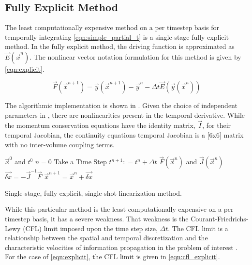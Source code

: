 \subsection{Fully Explicit Method}
\label{subsect:numerics_explicit}
The least computationally expensive method on a per timestep basis for temporally integrating \eqref{eqn:simple_partial_t} is a single-stage fully explicit method.
In the fully explicit method, the driving function is approximated as $\vec{E}(\vec{x}^n)$.
The nonlinear vector notation formulation for this method is given by \eqref{eqn:explicit}.

\begin{equation}
\label{eqn:explicit}
\vec{F}(\vec{x}^{n+1}) = \vec{y}(\vec{x}^{n+1}) - \vec{y}^{n} - \Delta t \vec{E}(\vec{y}(\vec{x}^{n}))
\end{equation}

The algorithmic implementation is shown in .
Given the choice of independent parameters in \cobra{}, there are nonlinearities present in the temporal derivative.
While the momentum conservation equations have the identity matrix, $\vec{I}$, for their temporal Jacobian, the continuity equations temporal Jacobian is a [6x6] matrix with no inter-volume coupling terms.

\begin{algo}[H]
\setlength{\baselineskip}{0.625\baselineskip}
\begin{algorithmic}[1]
\Require $\vec{x}^{0}$ and $t^{0}$
\Set $n = 0$
\Loop \; Take a Time Step
    \State $t^{n+1} : = t^{n} + \Delta t$
    \Calculate $\vec{F}(\vec{x}^n)$ and $\vec{J}(\vec{x}^n)$
    \Calculate $\vec{\delta x} = -\vec{J}^{-1}\vec{F}$
    \Calculate $\vec{x}^{n+1} = \vec{x}^{n} + \vec{\delta x}$ 
\end{algorithmic}
\caption{Single-stage, fully explicit, single-shot linearization method.}
\label{algo:explicit}
\end{algo}

While this particular method is the least computationally expensive on a per timestep basis, it has a severe weakness.
That weakness is the Courant-Friedrichs-Lewy (CFL) limit imposed upon the time step size, $\Delta t$.
The CFL limit is a relationship between the spatial and temporal discretization and the characteristic velocities of information propagation in the problem of interest \cite{LeVeque2007, Tannehill1997}.
For the case of \eqref{eqn:explicit}, the CFL limit is given in \eqref{eqn:cfl_explicit}.

